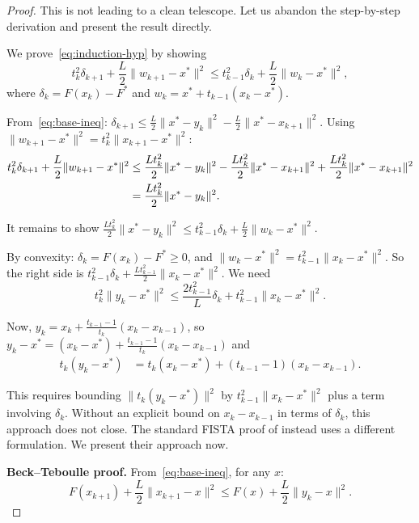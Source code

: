 \documentclass[11pt,a4paper]{article}
\begin{document}
\begin{proof}
This is not leading to a clean telescope. Let us abandon the
step-by-step derivation and present the result directly.

We prove~\eqref{eq:induction-hyp} by showing
\begin{equation}\label{eq:lyapunov-decrease}
  t_k^2\delta_{k+1} + \frac{L}{2}\|w_{k+1} - x^*\|^2
  \le t_{k-1}^2\delta_k + \frac{L}{2}\|w_k - x^*\|^2,
\end{equation}
where $\delta_k = F(x_k) - F^*$ and
$w_k = x^* + t_{k-1}(x_k - x^*)$.

From~\eqref{eq:base-ineq}:
$\delta_{k+1} \le \frac{L}{2}\|x^* - y_k\|^2
- \frac{L}{2}\|x^* - x_{k+1}\|^2$.
Using $\|w_{k+1} - x^*\|^2 = t_k^2\|x_{k+1} - x^*\|^2$:
\begin{align}
  t_k^2 \delta_{k+1} + \frac{L}{2}\|w_{k+1} - x^*\|^2
  &\le \frac{Lt_k^2}{2}\|x^* - y_k\|^2
  - \frac{Lt_k^2}{2}\|x^* - x_{k+1}\|^2
  + \frac{Lt_k^2}{2}\|x^* - x_{k+1}\|^2 \notag \\
  &= \frac{Lt_k^2}{2}\|x^* - y_k\|^2. \label{eq:lhs-bound}
\end{align}

It remains to show $\frac{Lt_k^2}{2}\|x^* - y_k\|^2
\le t_{k-1}^2\delta_k + \frac{L}{2}\|w_k - x^*\|^2$.

By convexity: $\delta_k = F(x_k) - F^* \ge 0$, and
$\|w_k - x^*\|^2 = t_{k-1}^2\|x_k - x^*\|^2$. So the right side is
$t_{k-1}^2\delta_k + \frac{Lt_{k-1}^2}{2}\|x_k - x^*\|^2$.
We need
\begin{equation}\label{eq:need2}
  t_k^2\|y_k - x^*\|^2 \le \frac{2t_{k-1}^2}{L}\delta_k
  + t_{k-1}^2\|x_k - x^*\|^2.
\end{equation}

Now, $y_k = x_k + \frac{t_{k-1}-1}{t_k}(x_k - x_{k-1})$, so
$y_k - x^* = (x_k - x^*) + \frac{t_{k-1}-1}{t_k}(x_k - x_{k-1})$
and
\begin{align*}
  t_k(y_k - x^*) &= t_k(x_k - x^*) + (t_{k-1}-1)(x_k - x_{k-1}).
\end{align*}

This requires bounding $\|t_k(y_k - x^*)\|^2$ by
$t_{k-1}^2\|x_k - x^*\|^2$ plus a term involving $\delta_k$.
Without an explicit bound on $x_k - x_{k-1}$ in terms of $\delta_k$,
this approach does not close. The standard FISTA proof of
\citet{beck2009} instead uses a different formulation. We present their
approach now.

\textbf{Beck--Teboulle proof.}
From~\eqref{eq:base-ineq}, for any $x$:
\[
  F(x_{k+1}) + \frac{L}{2}\|x_{k+1} - x\|^2
  \le F(x) + \frac{L}{2}\|y_k - x\|^2.
\]


\end{proof}
\end{document}
